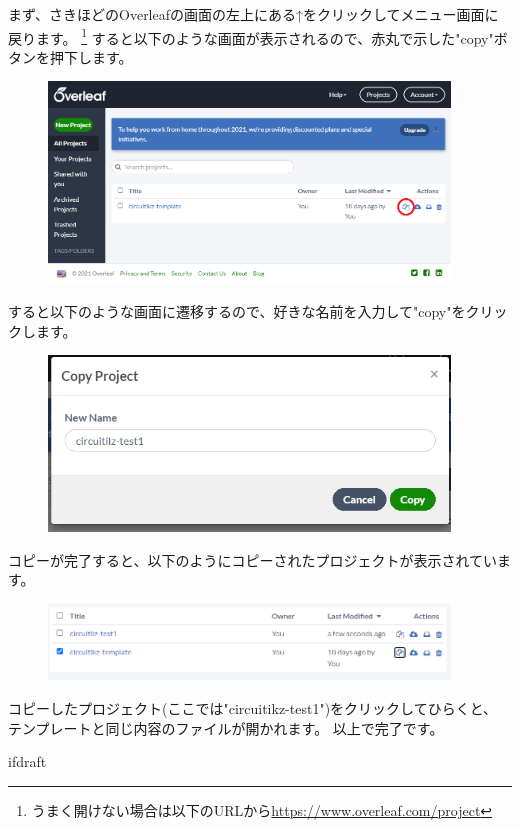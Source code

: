 		まず、さきほどのOverleafの画面の左上にある↑をクリックしてメニュー画面に戻ります。
		\footnote{うまく開けない場合は以下のURLから\url{https://www.overleaf.com/project}}
		すると以下のような画面が表示されるので、赤丸で示した"copy"ボタンを押下します。
		\begin{figure}
			\includegraphics[width=0.95\textwidth]{overleaf-menu.png}
		\end{figure}
		すると以下のような画面に遷移するので、好きな名前を入力して"copy"をクリックします。
		\begin{figure}
			\includegraphics[width=0.95\textwidth]{overleaf-menu-copy.png}
		\end{figure}
		コピーが完了すると、以下のようにコピーされたプロジェクトが表示されています。
		\begin{figure}
			\includegraphics[width=0.95\textwidth]{overleaf-menu-copied.png}	
		\end{figure}
		コピーしたプロジェクト(ここでは"circuitikz-test1")をクリックしてひらくと、
		テンプレートと同じ内容のファイルが開かれます。
		以上で完了です。
		
		\expandafter\ifx\csname ifdraft\endcsname\relax

\fi